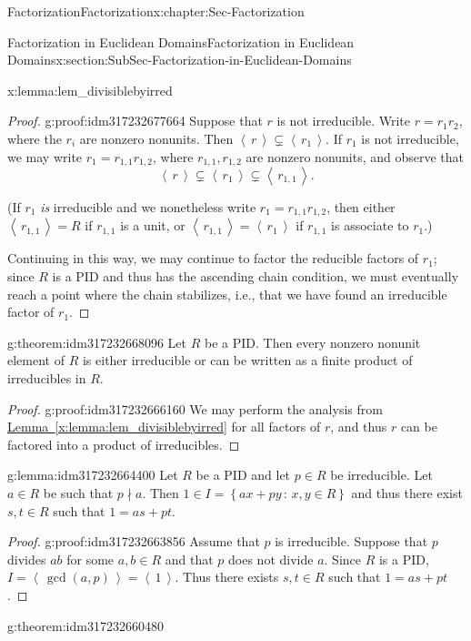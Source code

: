 \documentclass[oneside,10pt,]{book}
\newcommand{\xreffont}{\relax}
\numberwithin{equation}{section}
\newcommand{\ideal}[1]{\left\langle\, #1 \,\right\rangle}
\newcommand{\setof}[2]{{\left\{#1\,\colon\,#2\right\}}}
\begin{document}
\begin{chapterptx}{Factorization}{}{Factorization}{}{}{x:chapter:Sec-Factorization}
\begin{sectionptx}{Factorization in Euclidean Domains}{}{Factorization in Euclidean Domains}{}{}{x:section:SubSec-Factorization-in-Euclidean-Domains}
\begin{lemma}{}{}{x:lemma:lem_divisiblebyirred}
\end{lemma}
\begin{proof}{}{g:proof:idm317232677664}
Suppose that \(r\) is not irreducible. Write \(r = r_1 r_2\), where the \(r_i\) are nonzero nonunits. Then \(\ideal{r} \subsetneq \ideal{r_1}\). If \(r_1\) is not irreducible, we may write \(r_1 = r_{1,1}r_{1,2}\), where \(r_{1,1},r_{1,2}\) are nonzero nonunits, and observe that%
\begin{equation*}
\ideal{r} \subsetneq \ideal{r_1}\subsetneq \ideal{r_{1,1}}\text{.}
\end{equation*}
%
\par
(If \(r_1\) \emph{is} irreducible and we nonetheless write \(r_1 = r_{1,1} r_{1,2}\), then either \(\ideal{r_{1,1}} = R\) if \(r_{1,1}\) is a unit, or \(\ideal{r_{1,1}} = \ideal{r_1}\) if \(r_{1,1}\) is associate to \(r_1\).)%
\par
Continuing in this way, we may continue to factor the reducible factors of \(r_1\); since \(R\) is a PID and thus has the ascending chain condition, we must eventually reach a point where the chain stabilizes, i.e., that we have found an irreducible factor of \(r_1\).%
\end{proof}
\begin{theorem}{}{}{g:theorem:idm317232668096}%
Let \(R\) be a PID. Then every nonzero nonunit element of \(R\) is either irreducible or can be written as a finite product of irreducibles in \(R\).%
\end{theorem}
\begin{proof}{}{g:proof:idm317232666160}
We may perform the analysis from \hyperref[x:lemma:lem_divisiblebyirred]{Lemma~{\xreffont\ref{x:lemma:lem_divisiblebyirred}}} for all factors of \(r\), and thus \(r\) can be factored into a product of irreducibles.%
\end{proof}
\begin{lemma}{}{}{g:lemma:idm317232664400}%
Let \(R\) be a PID and let \(p\in R\) be irreducible. Let \(a\in R\) be such that \(p\nmid a\). Then \(1\in I = \setof{ax+py}{x,y\in R}\) and thus there exist \(s,t\in R\) such that \(1 = as+pt\).%
\end{lemma}
\begin{proof}{}{g:proof:idm317232663856}
Assume that \(p\) is irreducible. Suppose that \(p\) divides \(ab\) for some \(a,b \in R\) and that \(p\) does not divide \(a\). Since \(R\) is a PID, \(I = \ideal{\gcd(a,p)} = \ideal{1}\). Thus there exists \(s,t\in R\) such that \(1=as+pt\).%
\end{proof}
\begin{theorem}{}{}{g:theorem:idm317232660480}%

\end{theorem}
\end{sectionptx}
\end{chapterptx}
\end{document}
